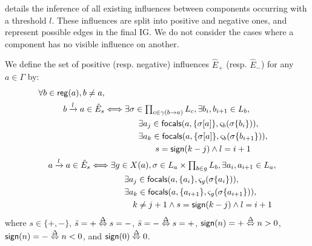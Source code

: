  details the inference of all existing influences between components occurring
with a threshold $l$.
These influences are split into positive and negative ones, and represent possible edges in the final IG.
We do not consider the cases where a component has no visible influence on another.
\begin{proposition}\label{pps:inference-edges}
We define the set of positive (resp. negative) influences $\hat{E}_+$ (resp. $\hat{E}_-$) for any
$a\in\Gamma$ by:
\begin{align}
\begin{split}
\forall b\in\mathsf{reg}({a}), b\neq a, \\
b\xrightarrow l a \in \hat{E}_s & \Longleftrightarrow
 \exists \sigma\in\textstyle\prod_{c\in\gamma(b\rightarrow a)} L_c, \exists b_i,b_{i+1}\in L_b,\\
& \qquad\qquad
        \exists a_{j}\in\mathsf{focals}(a, \{\sigma[a]\}, \varsigma_b(\sigma\{b_i\})), \\
& \qquad\qquad
        \exists a_{k}\in\mathsf{focals}(a, \{\sigma[a]\}, \varsigma_b(\sigma\{b_{i+1}\})), \\
& \qquad\qquad\qquad
                        s = \mathsf{sign}(k - j) \wedge l = i+1
\end{split}
\label{eq:edges-inference-b}
\\
\begin{split}
a \xrightarrow l a \in \hat{E}_s & \Longleftrightarrow
\exists g \in X(a), \sigma \in L_a\times \textstyle\prod_{b\in g} L_b,
			\exists a_i,a_{i+1}\in L_a, \\
& \qquad\qquad
        \exists a_{j}\in\mathsf{focals}(a, \{a_i\}, \varsigma_g(\sigma\{a_i\})), \\
& \qquad\qquad
        \exists a_{k}\in\mathsf{focals}(a, \{a_{i+1}\},  \varsigma_g(\sigma\{a_{i+1}\})), \\
& \qquad\qquad\quad
			k \neq j+1
				\wedge s = \mathsf{sign}(k - j) \wedge l = i+1
\end{split}
\label{eq:edges-inference-a}
\end{align}
where $s \in \{ +, - \}$, $\bar s = + \stackrel{\Delta}\Leftrightarrow s = -$, $\bar s = - \stackrel{\Delta}\Leftrightarrow s = +$,
$\mathsf{sign}(n) = + \stackrel{\Delta}\Leftrightarrow n > 0$,
$\mathsf{sign}(n) = - \stackrel{\Delta}\Leftrightarrow n < 0$,
and $\mathsf{sign}(0) \stackrel{\Delta}\Leftrightarrow 0$.
\end{proposition}

